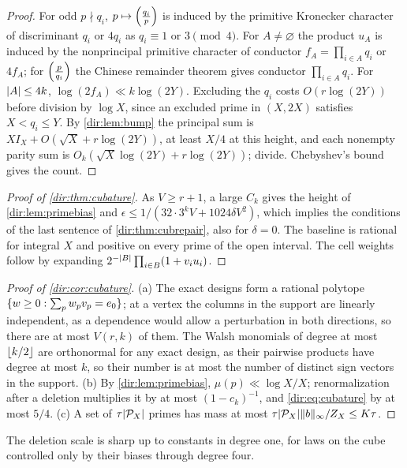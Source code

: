\begin{proof}
For odd $p\nmid q_i$, $p\mapsto\Bigl(\frac{q_i}{p}\Bigr)$ is induced by the primitive Kronecker character of
discriminant $q_i$ or $4q_i$ as $q_i\equiv1$ or $3\pmod4$. For $A\ne\varnothing$ the product $u_A$ is induced by
the nonprincipal primitive character of conductor $f_A=\prod_{i\in A}q_i$ or $4f_A$; for $\Bigl(\frac{p}{q_i}\Bigr)$ the
Chinese remainder theorem gives conductor $\prod_{i\in A}q_i$. For $\lvert A\rvert\le4k$, $\log(2f_A)\ll k\log(2Y)$.
Excluding the $q_i$ costs $O(r\log(2Y))$ before division by $\log X$, since an excluded prime in $(X,2X)$
satisfies $X<q_i\le Y$. By \cref{dir:lem:bump} the principal sum is $XI_X+O(\sqrt X+r\log(2Y))$, at least
$X/4$ at this height, and each nonempty parity sum is $O_k(\sqrt X\log(2Y)+r\log(2Y))$; divide. Chebyshev's
bound gives the count.
\end{proof}

\begin{proof}[Proof of \cref{dir:thm:cubature}]
As $V\ge r+1$, a large $C_k$ gives the height of \cref{dir:lem:primebias} and
$\epsilon\le1/(32\cdot3^kV+1024\delta V^2)$, which implies the conditions of the last sentence of
\cref{dir:thm:cubrepair}, also for $\delta=0$. The baseline is rational for integral $X$ and positive on every
prime of the open interval. The cell weights follow by expanding $2^{-\lvert B\rvert}\prod_{i\in B}(1+v_iu_i)$.
\end{proof}

\begin{proof}[Proof of \cref{dir:cor:cubature}]
(a) The exact designs form a rational polytope $\{w\ge0:\sum_pw_pv_p=e_0\}$; at a vertex the columns in
the support are linearly independent, as a dependence would allow a perturbation in both directions, so there
are at most $V(r,k)$ of them. The Walsh monomials of degree at most $\lfloor k/2\rfloor$ are orthonormal for any exact
design, as their pairwise products have degree at most $k$, so their number is at most the number of distinct
sign vectors in the support. (b) By \cref{dir:lem:primebias}, $\mu(p)\ll\log X/X$; renormalization after a
deletion multiplies it by at most $(1-c_k)^{-1}$, and \eqref{dir:eq:cubature} by at most $5/4$. (c) A set of
$\tau\lvert\mathcal P_X\rvert$ primes has mass at most $\tau\lvert\mathcal P_X\rvert\lVert b\rVert_\infty/Z_X\le K\tau$.
\end{proof}

The deletion scale is sharp up to constants in degree one, for laws on the cube controlled only by their biases
through degree four.

